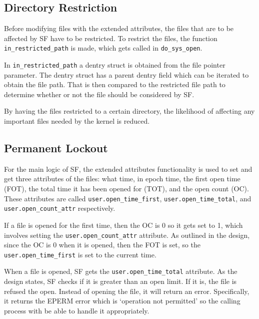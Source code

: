 \subsection{Directory Restriction}

Before modifying files with the extended attributes, the files that are to be affected by SF have to be restricted. To restrict the files, the function \texttt{in\_restricted\_path} is made, which gets called in \texttt{do\_sys\_open}. 

In \texttt{in\_restricted\_path} a dentry struct is obtained from the file pointer parameter. The dentry struct has a parent dentry field which can be iterated to obtain the file path. That is then compared to the restricted file path to determine whether or not the file should be considered by SF.

By having the files restricted to a certain directory, the likelihood of affecting any important files needed by the kernel is reduced. 

\subsection{Permanent Lockout}

For the main logic of SF, the extended attributes functionality is used to set and get three attributes of the files: what time, in epoch time, the first open time (FOT), the total time it has been opened for (TOT), and the open count (OC). These attributes are called \texttt{user.open\_time\_first}, \texttt{user.open\_time\_total}, and \texttt{user.open\_count\_attr} respectively.

If a file is opened for the first time, then the OC is 0 so it gets set to 1, which involves setting the \texttt{user.open\_count\_attr} attribute. As outlined in the design, since the OC is 0 when it is opened, then the FOT is set, so the \texttt{user.open\_time\_first} is set to the current time.

When a file is opened, SF gets the \texttt{user.open\_time\_total} attribute. As the design states, SF checks if it is greater than an open limit. If it is, the file is refused the open. Instead of opening the file, it will return an error. Specifically, it returns the EPERM error which is `operation not permitted' so the calling process with be able to handle it appropriately. 

